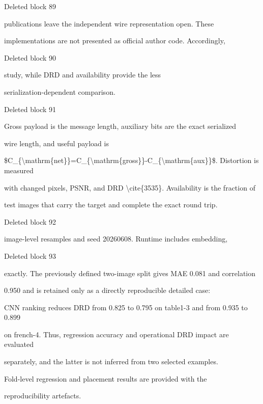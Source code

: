 \documentclass[a4paper,fleqn]{cas-dc}
\newenvironment{RevisionDeletion}{%
  \par\begingroup\color{revisionred}\footnotesize\ttfamily
  \setlength{\parindent}{0pt}\setlength{\parskip}{1pt}\obeyspaces
}{\par\endgroup}
\begin{document}
\begin{RevisionDeletion}
Deleted block 89\par
publications leave the independent wire representation open. These\par
implementations are not presented as official author code. Accordingly,\par
\end{RevisionDeletion}

\begin{RevisionDeletion}
Deleted block 90\par
study, while DRD and availability provide the less\par
serialization-dependent comparison.\par
\end{RevisionDeletion}

\begin{RevisionDeletion}
Deleted block 91\par
Gross payload is the message length, auxiliary bits are the exact serialized\par
wire length, and useful payload is\par
\$C\_\{\textbackslash{}mathrm\{net\}\}=C\_\{\textbackslash{}mathrm\{gross\}\}-C\_\{\textbackslash{}mathrm\{aux\}\}\$. Distortion is measured\par
with changed pixels, PSNR, and DRD \textbackslash{}cite\{3535\}. Availability is the fraction of\par
test images that carry the target and complete the exact round trip.\par
\end{RevisionDeletion}

\begin{RevisionDeletion}
Deleted block 92\par
image-level resamples and seed 20260608. Runtime includes embedding,\par
\end{RevisionDeletion}

\begin{RevisionDeletion}
Deleted block 93\par
exactly. The previously defined two-image split gives MAE 0.081 and correlation\par
0.950 and is retained only as a directly reproducible detailed case:\par
CNN ranking reduces DRD from 0.825 to 0.795 on table1-3 and from 0.935 to 0.899\par
on french-4. Thus, regression accuracy and operational DRD impact are evaluated\par
separately, and the latter is not inferred from two selected examples.\par
Fold-level regression and placement results are provided with the\par
reproducibility artefacts.\par
\end{RevisionDeletion}
\end{document}
